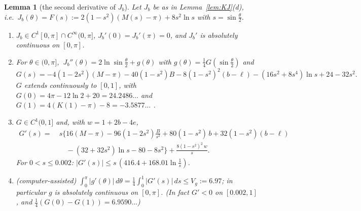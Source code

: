 \documentclass[11pt,a4paper]{article}
\theoremstyle{plain}
\newtheorem{lemma}[theorem]{Lemma}
\theoremstyle{definition}
\numberwithin{equation}{section}
\begin{document}
\begin{lemma}[the second derivative of $J_b$]\label{lem:Jb2}
Let $J_b$ be as in Lemma~\ref{lem:KJ}(d), i.e.\ $J_b(\theta)=F(s):=2(1-s^2)(M(s)-\pi)+8s^2\ln s$ with $s=\sin\frac\theta2$.
\begin{enumerate}
\item[(a)] $J_b\in C^1[0,\pi]\cap C^\infty(0,\pi]$, $J_b'(0)=J_b'(\pi)=0$, and $J_b'$ is absolutely continuous on $[0,\pi]$.
\item[(b)] For $\theta\in(0,\pi]$, $\ J_b''(\theta)=2\ln\sin\frac\theta2+g(\theta)$ with $g(\theta)=\frac14G(\sin\frac\theta2)$ and
\begin{equation}\label{eq:Gdef}
G(s)=-4(1-2s^2)(M-\pi)-40(1-s^2)B-8(1-s^2)^2(b-\ell)-(16s^2+8s^4)\ln s+24-32s^2 .
\end{equation}
$G$ extends continuously to $[0,1]$, with $G(0)=4\pi-12\ln2+20=24.2486\ldots$ and $G(1)=4(K(1)-\pi)-8=-3.5877\ldots$ .
\item[(c)] $G\in C^1(0,1]$ and, with $w=1+2b-4e$,
\begin{equation}\label{eq:Gprime}
\begin{aligned}G'(s)=\ &s\Big\{16(M-\pi)-96(1-2s^2)\frac{B}{s^2}+80(1-s^2)\,b+32(1-s^2)(b-\ell)\\&\quad-(32+32s^2)\ln s-80-8s^2\Big\}+\frac{8(1-s^2)^2\,w}{s}.\end{aligned}
\end{equation}
For $0<s\le0.002$: $|G'(s)|\le s\,(416.4+168.01\ln\frac1s)$.
\item[(d)] (computer-assisted) $\displaystyle\int_0^\pi|g'(\theta)|\,d\theta=\frac14\int_0^1|G'(s)|\,ds\le V_g:=6.97$; in particular $g$ is absolutely continuous on $[0,\pi]$. (In fact $G'<0$ on $[0.002,1]$, and $\frac14(G(0)-G(1))=6.9590\ldots$)
\end{enumerate}
\end{lemma}
\end{document}
